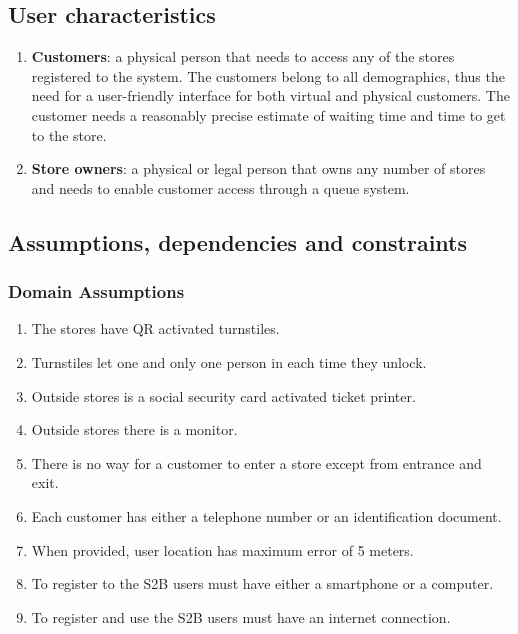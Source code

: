 \subsection{User characteristics}
\begin{enumerate}
	\item {\bfseries Customers}: a physical person that needs to access any of the stores registered to the system. The customers belong to all demographics, thus the need for a user-friendly interface for both virtual and physical customers. The customer needs a reasonably precise estimate of waiting time and time to get to the store.
	\item {\bfseries Store owners}: a physical or legal person that owns any number of stores and needs to enable customer access through a queue system.
\end{enumerate}

\subsection{Assumptions, dependencies and constraints}
\subsubsection{Domain Assumptions}
\begin{enumerate}[label=D\arabic*]
	\item The stores have QR activated turnstiles.
	\item Turnstiles let one and only one person in each time they unlock.
	\item Outside stores is a social security card activated ticket printer.
	\item Outside stores there is a monitor.
	\item There is no way for a customer to enter a store except from entrance and exit.
	\item Each customer has either a telephone number or an identification document.
	\item When provided, user location has maximum error of 5 meters.
	\item To register to the S2B users must have either a smartphone or a computer.
	\item To register and use the S2B users must have an internet connection.
\end{enumerate}